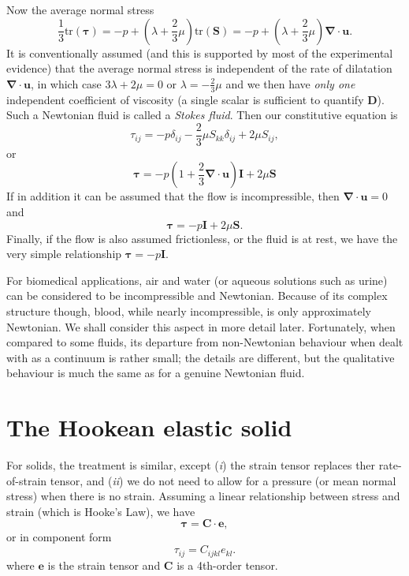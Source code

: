 \documentclass[a4paper,11pt]		{report}
\begin{document}
Now the average normal stress
\begin{equation}
\textstyle{\frac{1}{3}}\mathrm{tr}(\bm{\tau}) =
 -p + \left(\lambda + \textstyle{\frac{2}{3}}\mu\right)\mathrm{tr}(\bm{S})=
 -p + \left(\lambda + \textstyle{\frac{2}{3}}\mu\right)\bm{\nabla\cdot u}.
\end{equation}
It is conventionally assumed (and this is supported by most of the
experimental evidence) that the average normal stress is independent
of the rate of dilatation $\bm{\nabla\cdot u}$, in which case
$3\lambda + 2\mu=0$ or $\lambda=-\frac{2}{3}\mu$ and we then have
\emph{only one} independent coefficient of viscosity (\ie a single
scalar is sufficient to quantify $\bm{D}$). Such a Newtonian fluid is
called a \emph{Stokes fluid}. Then our constitutive equation is
\begin{equation}
\tau_{ij} = -p \delta_{ij} -
\textstyle{\frac{2}{3}}\mu S_{kk}\delta_{ij} + 2\mu S_{ij},
\end{equation}
or
\begin{equation}
\bm{\tau} = -p (1 +\textstyle{\frac{2}{3}}\bm{\nabla\cdot u})\bm{I} +
 2\mu\bm{S} 
\end{equation}
If in addition it can be assumed that the flow is incompressible, then
$\bm{\nabla\cdot u}=0$ and
\begin{equation}
\bm{\tau} = -p\bm{I} + 2\mu\bm{S}.
\label{eq.newtinc}
\end{equation}
Finally, if the flow is also assumed frictionless, or the fluid is at
rest, we have the very simple relationship $\bm{\tau} = -p\bm{I}$.

For biomedical applications, air and water (or aqueous solutions such
as urine) can be considered to be incompressible and
Newtonian. Because of its complex structure though, blood, while
nearly incompressible, is only approximately Newtonian. We shall
consider this aspect in more detail later. Fortunately, when compared
to some fluids, its departure from non-Newtonian behaviour when dealt
with as a continuum is rather small; the details are different, but
the qualitative behaviour is much the same as for a genuine Newtonian
fluid.

\section{The Hookean elastic solid}

For solids, the treatment is similar, except (\textit{i}) the strain
tensor replaces ther rate-of-strain tensor, and (\textit{ii}) we do
not need to allow for a pressure (or mean normal stress) when there is
no strain. Assuming a linear relationship between stress and strain
(which is Hooke's Law), we have
\begin{equation}
\bm{\tau}=\bm{C\cdot e},
\end{equation}
or in component form
\begin{equation}
\tau_{ij} = C_{ijkl}e_{kl}.
\end{equation}
where $\bm{e}$ is the strain tensor and $\bm{C}$ is a 4th-order tensor.
\end{document}
